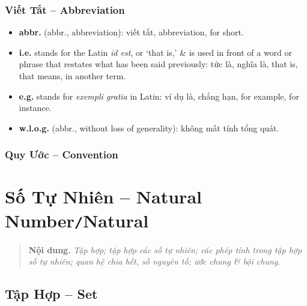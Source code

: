 \documentclass[oneside]{book}
\numberwithin{equation}{section}
\begin{document}
\subsection*{Viết Tắt -- Abbreviation}
\begin{itemize}
	\item \textbf{abbr.} (abbr., abbreviation): viết tắt, abbreviation, for short.
	\item \textbf{i.e.} stands for the Latin \textit{id est}, or `that is,' \& is used in front of a word or phrase that restates what has been said previously: tức là, nghĩa là, that is, that means, in another term.
	\item \textbf{e.g.} stands for \textit{exempli gratia} in Latin: ví dụ là, chẳng hạn, for example, for instance.
	\item \textbf{w.l.o.g.} (abbr., without loss of generality): không mất tính tổng quát.
\end{itemize}

\subsection*{Quy Ước -- Convention}


\chapter{Số Tự Nhiên -- Natural Number\texttt{/}Natural}

\begin{quotation}
	\textbf{Nội dung.} \textit{Tập hợp; tập hợp các số tự nhiên; các phép tính trong tập hợp số tự nhiên; quan hệ chia hết, số nguyên tố; ước chung \textit{\&} bội chung}.
\end{quotation}

\section{Tập Hợp -- Set}
\end{document}
